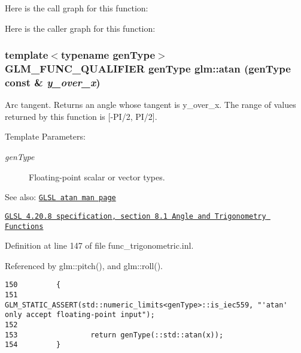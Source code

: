 Here is the call graph for this function:

Here is the caller graph for this function:\hypertarget{group__core__func__trigonometric_g459eaa7149e799125acda24938114746}{
\subsubsection[atan]{\setlength{\rightskip}{0pt plus 5cm}template$<$typename genType$>$ GLM\_\-FUNC\_\-QUALIFIER genType glm::atan (genType const \& {\em y\_\-over\_\-x})}}
\label{group__core__func__trigonometric_g459eaa7149e799125acda24938114746}


Arc tangent. Returns an angle whose tangent is y\_\-over\_\-x. The range of values returned by this function is \mbox{[}-PI/2, PI/2\mbox{]}.

\begin{Desc}
\item[Template Parameters:]
\begin{description}
\item[{\em genType}]Floating-point scalar or vector types.\end{description}
\end{Desc}
\begin{Desc}
\item[See also:]\href{http://www.opengl.org/sdk/docs/manglsl/xhtml/atan.xml}{\tt GLSL atan man page} 

\href{http://www.opengl.org/registry/doc/GLSLangSpec.4.20.8.pdf}{\tt GLSL 4.20.8 specification, section 8.1 Angle and Trigonometry Functions} \end{Desc}


Definition at line 147 of file func\_\-trigonometric.inl.

Referenced by glm::pitch(), and glm::roll().

\begin{Code}\begin{verbatim}150         {
151                 GLM_STATIC_ASSERT(std::numeric_limits<genType>::is_iec559, "'atan' only accept floating-point input");
152 
153                 return genType(::std::atan(x));
154         }
\end{verbatim}
\end{Code}




